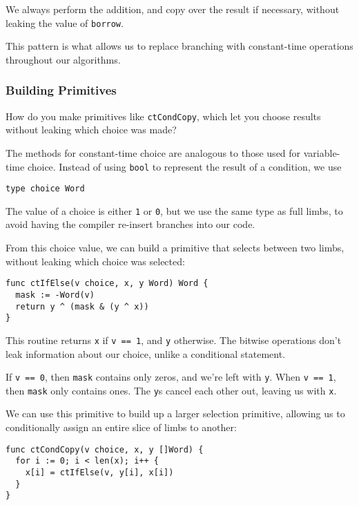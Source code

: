 \documentclass[11pt, a4paper]{article} %
\begin{document}
{We always perform the addition, and copy over the result if necessary,
without leaking the value of \texttt{borrow}.

This pattern is what allows us to replace
branching with constant-time operations throughout
our algorithms.

\subsubsection{Building Primitives}

How do you make primitives like
\texttt{ctCondCopy}, which let you choose results without
leaking which choice was made?

The methods for constant-time choice are analogous to
those used for variable-time choice. Instead of using
\texttt{bool} to represent the result of a condition, we use

\begin{verbatim}
type choice Word
\end{verbatim}

The value of a choice is either \texttt{1} or \texttt{0},
but we use the same
type as full limbs, to avoid having the compiler
re-insert branches into our code.

From this choice value, we can build a primitive that selects
between two limbs, without leaking which choice was selected:

\begin{verbatim}
func ctIfElse(v choice, x, y Word) Word {
  mask := -Word(v)
  return y ^ (mask & (y ^ x))
} 
\end{verbatim}

This routine returns \texttt{x} if
\texttt{v == 1}, and \texttt{y} otherwise.
The bitwise operations don't leak information about
our choice, unlike a conditional statement.

If \texttt{v == 0}, then \texttt{mask} contains only zeros, and we're left
with \texttt{y}. When \texttt{v == 1},
then \texttt{mask} only contains ones. The \texttt{y}s cancel each
other out,
leaving us with \texttt{x}.

We can use this primitive to build up a larger selection primitive,
allowing us to conditionally
assign an entire slice of limbs to another:

\begin{verbatim}
func ctCondCopy(v choice, x, y []Word) {
  for i := 0; i < len(x); i++ {
    x[i] = ctIfElse(v, y[i], x[i])
  }
}
\end{verbatim}

}
\end{document}

